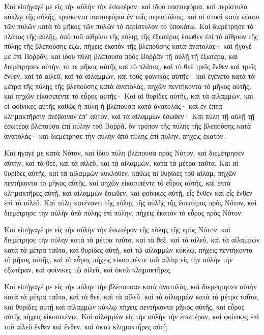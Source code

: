 {\par }{\PP {}Καὶ εἰσήγαγέ με εἰς τὴν αὐλὴν τὴν ἐσωτέραν, καὶ ἰδοὺ παστοφόρια, καὶ περίστυλα κύκλῳ τῆς αὐλῆς, τριάκοντα παστοφόρια ἐν τοῖς περιστύλοις,
καὶ αἱ στοαὶ κατὰ νώτου τῶν πυλῶν κατὰ τὸ μῆκος τῶν πυλῶν τὸ περίστυλον τὸ ὑποκάτω.
Καὶ διεμέτρησε τὸ πλάτος τῆς αὐλῆς, ἀπὸ τοῦ αἰθρίου τῆς πύλης τῆς ἐξωτέρας ἔσωθεν ἐπὶ τὸ αἴθριον τῆς πύλης τῆς βλεπούσης ἔξω, πήχεις ἑκατὸν τῆς βλεπούσης κατὰ ἀνατολάς· καὶ ἤγαγέ με ἐπὶ Βοῤῥᾶν,
καὶ ἰδοὺ πύλη βλέπουσα πρὸς Βοῤῥᾶν τῇ αὐλῇ τῇ ἐξωτέρᾳ, καὶ διεμέτρησεν αὐτὴν, τό τε μῆκος αὐτῆς καὶ τὸ πλάτος,
καὶ τὸ θεὲ τρεῖς ἔνθεν καὶ τρεῖς ἔνθεν, καὶ τὸ αἰλεῦ, καὶ τὰ αἰλαμμὼν, καὶ τοὺς φοίνικας αὐτῆς· καὶ ἐγένετο κατὰ τὰ μέτρα τῆς πύλης τῆς βλεπούσης κατὰ ἀνατολὰς, πηχῶν πεντήκοντα τὸ μῆκος αὐτῆς, καὶ πηχῶν εἰκοσιπέντε τὸ εὖρος αὐτῆς·
Καὶ αἱ θυρίδες αὐτῆς, καὶ τὰ αἰλαμμὼν, καὶ οἱ φοίνικες αὐτῆς καθὼς ἡ πύλη ἡ βλέπουσα κατὰ ἀνατολάς· καὶ ἐν ἑπτὰ κλημακτῆρσιν ἀνέβαινον ἐπʼ αὐτὸν, καὶ τὰ αἰλαμμὼν ἔσωθεν·
Καὶ πύλη τῇ αὐλῇ τῇ ἐσωτέρᾳ βλέπουσα ἐπὶ πύλην τοῦ Βοῤῥᾶ, ὃν τρόπον τῆς πύλης τῆς βλεπούσης κατὰ ἀνατολάς· καὶ διεμέτρησε τὴν αὐλὴν ἀπὸ πύλης ἐπὶ πύλην, πήχεις ἑκατόν.
\par }{\PP {}Καὶ ἤγαγέ με κατὰ Νότον, καὶ ἰδοὺ πύλη βλέπουσα πρὸς Νότον, καὶ διεμέτρησεν αὐτὴν, καὶ τὰ θεὲ, καὶ τὰ αἰλεῦ, καὶ τὰ αἰλαμμὼν, κατὰ τὰ μέτρα ταῦτα.
Καὶ αἱ θυρίδες αὐτῆς, καὶ τὰ αἰλαμμὼν κυκλόθεν, καθὼς αἱ θυρίδες τοῦ αἰλὰμ, πηχῶν πεντήκοντα τὸ μῆκος αὐτῆς, καὶ πηχῶν εἰκοσιπέντε τὸ εὖρος αὐτῆς,
καὶ ἑπτὰ κλημακτῆρες αὐτῇ, καὶ αἰλαμμὼν ἔσωθεν, καὶ φοίνικες αὐτῇ, εἷς ἔνθεν καὶ εἷς ἔνθεν ἐπὶ τὰ αἰλεῦ.
Καὶ πύλη κατέναντι τῆς πύλης τῆς αὐλῆς τῆς ἐσωτέρας πρὸς Νότον, καὶ διεμέτρησε τὴν αὐλὴν ἀπὸ πύλης ἐπὶ πύλην, πήχεις ἑκατὸν τὸ εὖρος πρὸς Νότον.
\par }{\PP {}Καὶ εἰσήγαγέ με εἰς τὴν αὐλὴν τὴν ἐσωτέραν τῆς πύλης τῆς πρὸς Νότον, καὶ διεμέτρησε τὴν πύλην κατὰ τὰ μέτρα ταῦτα,
καὶ τὰ θεὲ, καὶ τὰ αἰλεῦ, καὶ τὰ αἰλαμμὼν κατὰ τὰ μέτρα ταῦτα, καὶ θυρίδες αὐτῇ, καὶ τῷ αἰλαμμὼν κύκλῳ, πήχεις πεντήκοντα τὸ μῆκος αὐτῆς,
καὶ τὸ εὖρος πήχεις εἰκοσιπέντε τοῦ αἰλὰμ εἰς τὴν αὐλὴν τὴν ἐξωτέραν, καὶ φοίνικες τῷ αἰλεῦ, καὶ ὀκτὼ κλημακτῆρες.
\par }{\PP {}Καὶ εἰσήγαγέ με εἰς τὴν πύλην τὴν βλέπουσαν κατὰ ἀνατολὰς, καὶ διεμέτρησεν αὐτὴν κατὰ τὰ μέτρα ταῦτα,
καὶ τὰ θεὲ, καὶ τὰ αἰλεῦ, καὶ τὰ αἰλαμμὼν κατὰ τὰ μέτρα ταῦτα, καὶ θυρίδες αὐτῇ καὶ αἰλαμμὼν κύκλῳ πήχεις πεντήκοντα μῆκος αὐτῆς, καὶ εὖρος αὐτῆς πήχεις εἰκοσιπέντε.
Καὶ αἰλαμμὼν εἰς τὴν αὐλὴν τὴν ἐσωτέραν, καὶ φοίνικες ἐπὶ τοῦ αἰλεῦ ἔνθεν καὶ ἔνθεν, καὶ ὀκτὼ κλημακτῆρες αὐτῇ.
}
